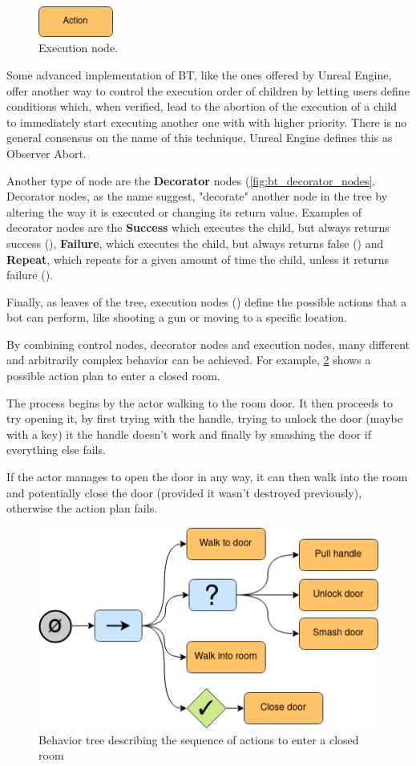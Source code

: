 \begin{figure}[H]
\centering
\includegraphics[height=1cm]{Images/images/bt/action.drawio.png} 
\caption{Execution node.}
\label{fig:end_bt_nodes}
\end{figure}

Some advanced implementation of BT, like the ones offered by Unreal Engine, offer another way to control the execution order of children by letting users define conditions which, when verified, lead to the abortion of the execution of a child to immediately start executing another one with with higher priority. There is no general consensus on the name of this technique, Unreal Engine defines this as Observer Abort. 

Another type of node are the \textbf{Decorator} nodes (\ref{fig:bt_decorator_nodes}. Decorator nodes, as the name suggest, "decorate" another node in the tree by altering the way it is executed or changing its return value. Examples of decorator nodes are the \textbf{Success} which executes the child, but always returns success (), \textbf{Failure}, which executes the child, but always returns false () and \textbf{Repeat}, which repeats for a given amount of time the child, unless it returns failure ().

Finally, as leaves of the tree, execution nodes () define the possible actions that a bot can perform, like shooting a gun or moving to a specific location.

By combining control nodes, decorator nodes and execution nodes, many different and arbitrarily complex behavior can be achieved. For example, \ref{fig:bt_appendix_tutorial} shows a possible action plan to enter a closed room.

The process begins by the actor walking to the room door. It then proceeds to try opening it, by first trying with the handle, trying to unlock the door (maybe with a key) it the handle doesn't work and finally by smashing the door if everything else fails.

If the actor manages to open the door in any way, it can then walk into the room and potentially close the door (provided it wasn't destroyed previously), otherwise the action plan fails.

\begin{figure}
\centering
\includegraphics[width=0.6\linewidth]{Images/images/BTTutorial.drawio.png}
\caption{Behavior tree describing the sequence of actions to enter a closed room}
\label{fig:bt_appendix_tutorial}
\end{figure}


